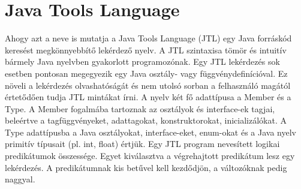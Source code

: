 \documentclass[a4paper,12pt]{report}
\begin{document}
\section{Java Tools Language}
\par Ahogy azt a neve is mutatja a Java Tools Language (JTL) egy Java forráskód keresést megkönnyebbítő lekérdező nyelv. A JTL szintaxisa tömör és intuitív bármely Java nyelvben gyakorlott programozónak. Egy JTL lekérdezés sok esetben pontosan megegyezik egy Java osztály- vagy függvénydefinícióval. Ez növeli a lekérdezés olvashatóságát és nem utolsó sorban a felhasználó magától értetődően tudja JTL mintákat írni. A nyelv két fő adattípusa a Member és a Type. A Member fogalmába tartoznak az osztályok és interface-ek tagjai, beleértve a tagfüggvényeket, adattagokat, konstruktorokat, inicializálókat. A Type adattípusba a Java osztályokat, interface-eket, enum-okat és a Java nyelv primitív típusait (pl. int, float) értjük. Egy JTL program nevesített logikai predikátumok összessége.  Egyet kiválasztva a végrehajtott predikátum lesz egy lekérdezés. A predikátumnak kis betűvel kell kezdődjön, a változóknak pedig naggyal.
\end{document}
